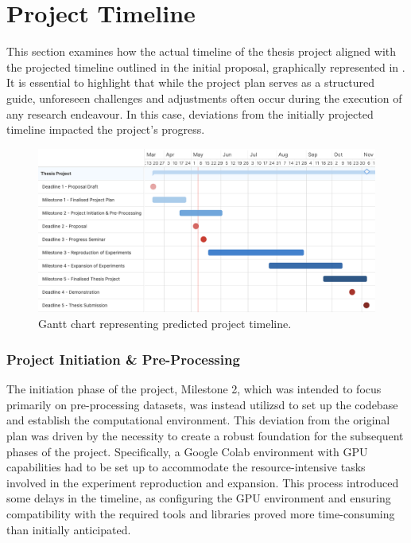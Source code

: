\section{Project Timeline}
This section examines how the actual timeline of the thesis project aligned with the projected timeline outlined in the initial proposal, graphically represented in . It is essential to highlight that while the project plan serves as a structured guide, unforeseen challenges and adjustments often occur during the execution of any research endeavour. In this case, deviations from the initially projected timeline impacted the project's progress.

\begin{figure}[h]
    \centering
    \includegraphics[width=\textwidth]{1Introduction/GanttChart.png}
    \caption{Gantt chart representing predicted project timeline.}
    \label{fig:gantt}
\end{figure}

\subsubsection{Project Initiation \& Pre-Processing}
The initiation phase of the project, Milestone 2, which was intended to focus primarily on pre-processing datasets, was instead utilizsd to set up the codebase and establish the computational environment. This deviation from the original plan was driven by the necessity to create a robust foundation for the subsequent phases of the project. Specifically, a Google Colab environment with GPU capabilities had to be set up to accommodate the resource-intensive tasks involved in the experiment reproduction and expansion. This process introduced some delays in the timeline, as configuring the GPU environment and ensuring compatibility with the required tools and libraries proved more time-consuming than initially anticipated.

